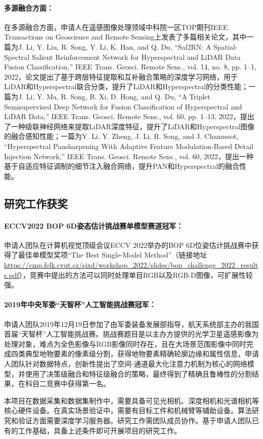 \documentclass[12pt]{article}
\newcommand{\myPara}[1]{\paragraph{#1：}}
\begin{document}
\myPara{多源融合方面}
在多源融合方面，申请人在遥感图像处理领域中科院一区TOP期刊IEEE Transactions on Geoscience and Remote Sensing上发表了多篇相关论文，其中一篇为J. Li, Y. Liu, R. Song, Y. Li, K. Han, and Q. Du, “Sal2RN: A Spatial-Spectral Salient Reinforcement Network for Hyperspectral and LiDAR Data Fusion Classification,” IEEE Trans. Geosci. Remote Sens., vol. 14, no. 8, pp. 1–1, 2022，论文提出了基于跨层特征提取和互补融合策略的深度学习网络，用于LiDAR和Hyperspectral联合分类，提升了LiDAR和Hyperspectral的分类性能；一篇为J. Li, Y. Ma, R. Song, B. Xi, D. Hong, and Q. Du, “A Triplet Semisupervised Deep Network for Fusion Classification of Hyperspectral and LiDAR Data,” IEEE Trans. Geosci. Remote Sens., vol. 60, pp. 1–13, 2022，提出了一种级联神经网络来提取LiDAR深度特征，提升了LiDAR和Hyperspectral图像的融合感知性能；一篇为Y. Li, Y. Zheng, J. Li, R. Song, and J. Chanussot, “Hyperspectral Pansharpening With Adaptive Feature Modulation-Based Detail Injection Network,” IEEE Trans. Geosci. Remote Sens., vol. 60, 2022，提出一种基于自适应特征调制的细节注入融合网络，提升PAN和Hyperspectral的融合性能。

\subsection{研究工作获奖}

\myPara{ECCV2022 BOP 6D姿态估计挑战赛单模型赛道冠军}
申请人团队在计算机视觉顶级会议ECCV 2022举办的BOP 6D位姿估计挑战赛中获得了最佳单模型奖项“The Best Single-Model Method”（链接地址\url{https://cmp.felk.cvut.cz/sixd/workshop_2022/slides/bop_challenge_2022_results.pdf}），竞赛中提出的方法可以同时处理单目RGB以及RGB-D图像，可扩展性较强。

\myPara{2019年中央军委“天智杯”人工智能挑战赛冠军}
申请人团队2019年12月19日参加了由军委装备发展部指导，航天系统部主办的我国首届“天智杯”人工智能挑战赛。挑战赛题目是以主办方提供的光学卫星遥感影像为处理对象，难点为全色影像与RGB影像同时存在，且在大场景范围影像中同时完成四类典型地物要素的像素级分割，获得地物要素精确轮廓边缘和属性信息，申请人团队针对数据特点，创新性提出了空间-通道最大化注意力机制为核心的网络模型，并使用了决策级融合和特征级融合的策略，最终得到了精确且鲁棒性的分割结果，在科目二竞赛中获得第一名。


本项目在数据采集和数据集制作中，需要具备可见光相机、深度相机和光谱相机等核心硬件设备。在真实场景验证中，需要有目标工件和机械臂等辅助设备。算法研究和验证方面需要深度学习服务器。研究工作需团队成员协作。基于申请人团队已有的工作基础，具备上述条件即可开展项目的研究工作。
\end{document}

